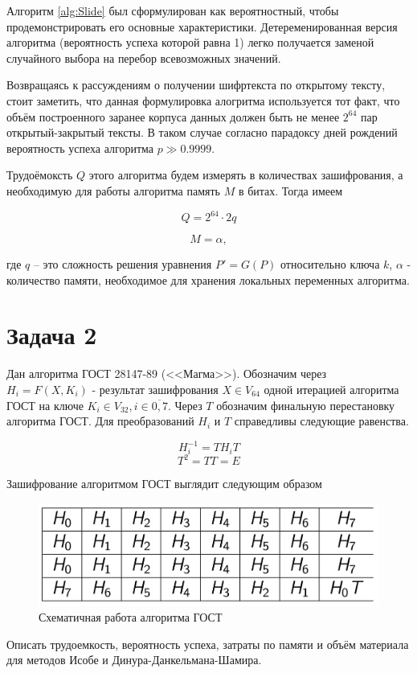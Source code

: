 \documentclass[a4paper,12pt]{article}
\theoremstyle{definition}
\begin{document}
	Алгоритм \ref{alg:Slide} был сформулирован как вероятностный, чтобы продемонстрировать его основные характеристики. Детеременированная версия алгоритма (вероятность успеха которой равна 1) легко получается заменой случайного выбора на перебор всевозможных значений. 
	
	Возвращаясь к рассуждениям о получении шифртекста по открытому тексту, стоит заметить, что данная формулировка алогритма используется тот факт, что объём построенного заранее корпуса данных должен быть не менее $2^{64}$ пар открытый-закрытый тексты. В таком случае согласно парадоксу дней рождений вероятность успеха алгоритма $p \gg 0.9999$.
	
	Трудоёмоксть $Q$ этого алгоритма будем измерять в количествах зашифрования, а необходимую для работы алгоритма память $M$ в битах. Тогда имеем
	
	\[ Q = 2^{64} \cdot 2q\]
	
	\[ M = \alpha, \]
	
	где $q$ -- это сложность решения уравнения $P'=G(P)$ относительно ключа $k$, $\alpha$ - количество памяти, необходимое для хранения локальных переменных алгоритма.
		
	\section*{Задача 2}
	Дан алгоритма ГОСТ 28147-89 (<<Магма>>). Обозначим через $H_i = F(X, K_i)$ - результат зашифрования $X \in V_{64}$ одной итерацией алгоритма ГОСТ на ключе
	$K_i \in V_{32}, i  \in \overline{0, 7}$. Через $T$ обозначим финальную перестановку алгоритма ГОСТ. Для преобразований $H_i$ и $T$ справедливы следующие равенства.
	
	\[H_i^{-1} = T H_i T \]
	\[T^2 = TT = E\]
	
	Зашифрование алгоритмом ГОСТ выглядит следующим образом
	\begin{figure}[h]
		\includegraphics[width=\linewidth]{gost}
		\caption{Схематичная работа алгоритма ГОСТ}
	\end{figure}

	Описать трудоемкость, вероятность успеха, затраты по памяти и объём материала для методов Исобе и Динура-Данкельмана-Шамира.
	
\end{document}

